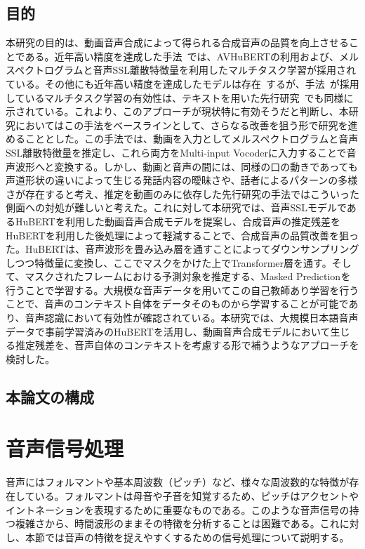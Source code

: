 \documentclass[12pt]{jarticle}
\numberwithin{equation}{section}    %
\numberwithin{figure}{section}      %
\numberwithin{table}{section}      %
\begin{document}
\subsection{目的}
本研究の目的は、動画音声合成によって得られる合成音声の品質を向上させることである。近年高い精度を達成した手法~\cite{choi2023intelligible}では、AVHuBERTの利用および、メルスペクトログラムと音声SSL離散特徴量を利用したマルチタスク学習が採用されている。その他にも近年高い精度を達成したモデルは存在~\cite{hsu2023revise,sahipjohn2023robustl2s,kim2024let}するが、手法~\cite{choi2023intelligible}が採用しているマルチタスク学習の有効性は、テキストを用いた先行研究~\cite{kim2023lip_multitask}でも同様に示されている。これより、このアプローチが現状特に有効そうだと判断し、本研究においてはこの手法をベースラインとして、さらなる改善を狙う形で研究を進めることとした。この手法では、動画を入力としてメルスペクトログラムと音声SSL離散特徴量を推定し、これら両方をMulti-input Vocoderに入力することで音声波形へと変換する。しかし、動画と音声の間には、同様の口の動きであっても声道形状の違いによって生じる発話内容の曖昧さや、話者によるパターンの多様さが存在すると考え、推定を動画のみに依存した先行研究の手法ではこういった側面への対処が難しいと考えた。これに対して本研究では、音声SSLモデルであるHuBERTを利用した動画音声合成モデルを提案し、合成音声の推定残差をHuBERTを利用した後処理によって軽減することで、合成音声の品質改善を狙った。HuBERTは、音声波形を畳み込み層を通すことによってダウンサンプリングしつつ特徴量に変換し、ここでマスクをかけた上でTransformer層を通す。そして、マスクされたフレームにおける予測対象を推定する、Masked Predictionを行うことで学習する。大規模な音声データを用いてこの自己教師あり学習を行うことで、音声のコンテキスト自体をデータそのものから学習することが可能であり、音声認識において有効性が確認されている。本研究では、大規模日本語音声データで事前学習済みのHuBERTを活用し、動画音声合成モデルにおいて生じる推定残差を、音声自体のコンテキストを考慮する形で補うようなアプローチを検討した。

\subsection{本論文の構成}
\clearpage

\section{音声信号処理}
音声にはフォルマントや基本周波数（ピッチ）など、様々な周波数的な特徴が存在している。フォルマントは母音や子音を知覚するため、ピッチはアクセントやイントネーションを表現するために重要なものである。このような音声信号の持つ複雑さから、時間波形のままその特徴を分析することは困難である。これに対し、本節では音声の特徴を捉えやすくするための信号処理について説明する。
\end{document}
